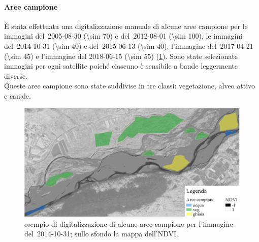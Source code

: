 \paragraph{Aree campione}
\`{E} stata effettuata una digitalizzazione manuale di alcune aree campione per le immagini \AST{} del~2005-08-30 (\num{\sim 70}) e del~2012-08-01 (\num{\sim 100}), le immagini \Pl{} del~2014-10-31 (\num{\sim 40}) e del~2015-06-13 (\num{\sim 40}), l'immagine \Se{} del~2017-04-21 (\num{\sim 45}) e l'immagine \WV{} del 2018-06-15 (\num{\sim 55}) (\cref{fig:esempio-aree-campione}).
	Sono state selezionate immagini per ogni satellite poiché ciascuno è sensibile a bande leggermente diverse. 
	\\
	Queste aree campione sono state suddivise in tre classi: vegetazione, alveo attivo e canale.
	\begin{figure}[ht]
		\centering
		\includegraphics[width=\textwidth]{files/esempio_aree_campione_2014_10_31.jpeg}
		\caption[esempio di aree campione per calcolare la distribuzione dell'NDVI]{esempio di digitalizzazione di alcune aree campione per l'immagine \Pl{} del~2014-10-31; sullo sfondo la mappa dell'NDVI.}
		\label{fig:esempio-aree-campione}
	\end{figure}
